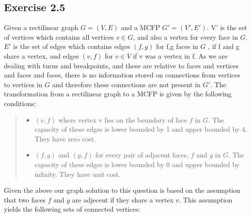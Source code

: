 \subsection{Exercise 2.5}
Given a rectilinear graph \(G = (V,E)\) and a MCFP \(G' = (V',E')\). V'  is the set of vertices which contains all vertices \(v \in G\), and also a vertex for every face in \(G\).  \(E'\) is the set of edges which contains edges \((f,g)\) for f,g faces in \(G\) , if f and g share a vertex, and edges \((v,f)\) for \(v \in V\) if v was a vertex in f. As we are dealing with turns and breakpoints, and these are relative to faces and vertices and faces and faces, there is no information stored on connections from vertices to vertices in \(G\) and therefore these connections are not present in \(G'\). 
The transformation from a rectilinear graph to a MCFP is given by the following conditions:
\begin{quote}
  \begin{itemize}
    \item{} \((v,f)\) where vertex v lies on the boundary of face \(f\) in \(G\). The capacity of these
        edges is lower bounded by 1 and upper bounded by 4. They have zero cost.
    \item{} \((f,g)\) and \((g,f)\) for every pair of adjacent faces, \(f\) and \(g\) in \(G\). The capacity of these edges is lower bounded by 0 and upper bounded by infinity. They have unit cost.
  \end{itemize}
\end{quote}

Given the above our graph solution to this question is based on the assumption that two faces \(f\) and \(g\) are adjecent if they share a vertex \(v\). This assumption yields the following sets of connected vertices:

